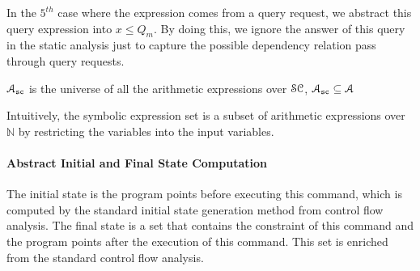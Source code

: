 In the $5^{th}$ case where the expression comes from a query request, we abstract this query expression into $x \leq Q_m$.
By doing this, we ignore the answer of this query in the static analysis just to capture the possible dependency relation pass through query requests.
\begin{defn}
 \label{def:symbolic_expr_domain}
 $\mathcal{A}_{\mathtt{sc}}$ is the universe of all the arithmetic expressions 
over $\mathcal{SC}$, $\mathcal{A}_{\mathtt{sc}} \subseteq \mathcal{A}$
\end{defn}
Intuitively, the symbolic expression set is a subset of arithmetic expressions over $\mathbb{N}$
by restricting the variables into the
input variables.

\paragraph{Abstract Initial and Final State Computation}
The initial state is the
program points before executing this command, which is computed by the standard initial state generation method from control flow analysis.
The final state is a set
that contains the constraint of this command and the program points after the execution of this command.
This set is enriched 
from the standard control flow analysis.

